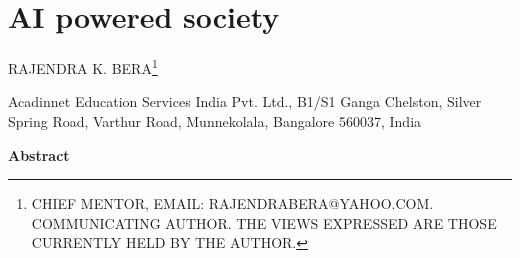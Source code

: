 \chapter*{AI powered society}


\begin{center}
\uppercase{Rajendra K. Bera\footnote{Chief Mentor, email: rajendrabera@yahoo.com. Communicating author. The views expressed are those currently held by
the author.}}

Acadinnet Education Services India Pvt. Ltd., B1/S1 Ganga Chelston, Silver Spring Road, Varthur Road, Munnekolala, Bangalore 560037, India
\end{center}


\begin{center}
\textbf{Abstract}
\end{center}

